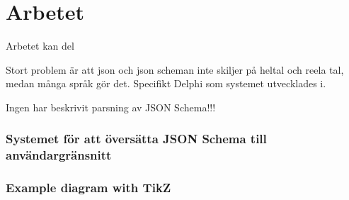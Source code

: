 \chapter{Arbetet}
Arbetet kan del


Stort problem är att json och json scheman inte skiljer på heltal och reela tal, medan många språk gör det. Specifikt Delphi som systemet utvecklades i.

Ingen har beskrivit parsning av JSON Schema!!!

\subsection{Systemet för att översätta JSON Schema till användargränsnitt}


\subsection{Example diagram with TikZ}